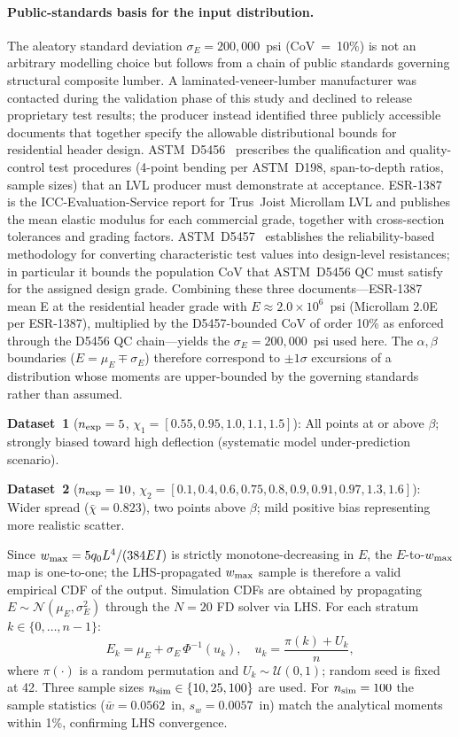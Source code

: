 \documentclass[10pt,twocolumn]{article}
\begin{document}
\paragraph{Public-standards basis for the input distribution.}
The aleatory standard deviation $\sigma_E=200{,}000$~psi (CoV~=~10\%)
is not an arbitrary modelling choice but follows from a chain of public
standards governing structural composite lumber.  A laminated-veneer-lumber
manufacturer was contacted during the validation phase of this study and
declined to release proprietary test results; the producer instead
identified three publicly accessible documents that together specify the
allowable distributional bounds for residential header design.
ASTM~D5456~\cite{astmD5456} prescribes the qualification and quality-control
test procedures (4-point bending per ASTM~D198, span-to-depth ratios, sample
sizes) that an LVL producer must demonstrate at acceptance.
ESR-1387~\cite{esr1387} is the ICC-Evaluation-Service report for Trus~Joist
Microllam LVL and publishes the mean elastic modulus for each commercial
grade, together with cross-section tolerances and grading factors.
ASTM~D5457~\cite{astmD5457} establishes the reliability-based methodology
for converting characteristic test values into design-level resistances;
in particular it bounds the population CoV that ASTM~D5456 QC must satisfy
for the assigned design grade.
Combining these three documents---ESR-1387 mean E at the residential header
grade with $E\!\approx\!2.0\times10^{6}$~psi (Microllam 2.0E per
ESR-1387), multiplied by the D5457-bounded CoV of order 10\% as enforced
through the D5456 QC chain---yields the $\sigma_E=200{,}000$~psi used here.
The $\alpha,\beta$ boundaries
($E=\mu_E\mp\sigma_E$) therefore correspond to $\pm1\sigma$ excursions of a
distribution whose moments are upper-bounded by the governing standards
rather than assumed.

\textbf{Dataset~1} ($n_{\rm exp}=5$, $\chi_1=[0.55,0.95,1.0,1.1,1.5]$):
All points at or above $\beta$; strongly biased toward high deflection
(systematic model under-prediction scenario).

\textbf{Dataset~2} ($n_{\rm exp}=10$,
$\chi_2=[0.1,0.4,0.6,0.75,0.8,0.9,0.91,0.97,1.3,1.6]$):
Wider spread ($\bar{\chi}=0.823$), two points above $\beta$;
mild positive bias representing more realistic scatter.

Since $w_{\rm max}=5q_0L^4/(384EI)$ is strictly monotone-decreasing
in $E$, the $E$-to-$w_{\rm max}$ map is one-to-one; the LHS-propagated
$w_{\rm max}$ sample is therefore a valid empirical CDF of the output.
Simulation CDFs are obtained by propagating
$E\sim\mathcal{N}(\mu_E,\sigma_E^2)$ through the $N=20$ FD solver via
LHS.  For each stratum $k\in\{0,\ldots,n-1\}$:
\begin{equation}
  E_k = \mu_E + \sigma_E\,\Phi^{-1}(u_k),\quad
  u_k = \frac{\pi(k)+U_k}{n},
  \label{eq:lhs}
\end{equation}
where $\pi(\cdot)$ is a random permutation and $U_k\sim\mathcal{U}(0,1)$;
random seed is fixed at 42.  Three sample sizes $n_{\rm sim}\in\{10,25,100\}$
are used.  For $n_{\rm sim}=100$ the sample statistics ($\bar{w}=0.0562$~in,
$s_w=0.0057$~in) match the analytical moments within 1\%, confirming
LHS convergence.
\end{document}

